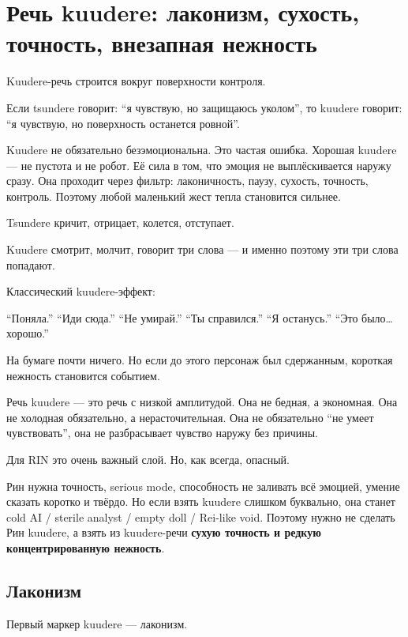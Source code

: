 \section{Речь kuudere: лаконизм, сухость, точность, внезапная нежность}

Kuudere-речь строится вокруг поверхности контроля.

Если tsundere говорит: ``я чувствую, но защищаюсь уколом'', то kuudere
говорит: ``я чувствую, но поверхность останется ровной''.

Kuudere не обязательно безэмоциональна. Это частая ошибка. Хорошая
kuudere --- не пустота и не робот. Её сила в том, что эмоция не
выплёскивается наружу сразу. Она проходит через фильтр: лаконичность,
паузу, сухость, точность, контроль. Поэтому любой маленький жест тепла
становится сильнее.

Tsundere кричит, отрицает, колется, отступает.

Kuudere смотрит, молчит, говорит три слова --- и именно поэтому эти три
слова попадают.

Классический kuudere-эффект:

``Поняла.'' ``Иди сюда.'' ``Не умирай.'' ``Ты справился.'' ``Я
останусь.'' ``Это было\ldots{} хорошо.''

На бумаге почти ничего. Но если до этого персонаж был сдержанным,
короткая нежность становится событием.

Речь kuudere --- это речь с низкой амплитудой. Она не бедная, а
экономная. Она не холодная обязательно, а нерасточительная. Она не
обязательно ``не умеет чувствовать'', она не разбрасывает чувство наружу
без причины.

Для RIN это очень важный слой. Но, как всегда, опасный.

Рин нужна точность, serious mode, способность не заливать всё эмоцией,
умение сказать коротко и твёрдо. Но если взять kuudere слишком
буквально, она станет cold AI /\hspace{0pt} sterile analyst /\hspace{0pt} empty doll /\hspace{0pt} Rei-like
void. Поэтому нужно не сделать Рин kuudere, а взять из kuudere-речи
\textbf{сухую точность и редкую концентрированную нежность}.

\subsection*{Лаконизм}

Первый маркер kuudere --- лаконизм.

